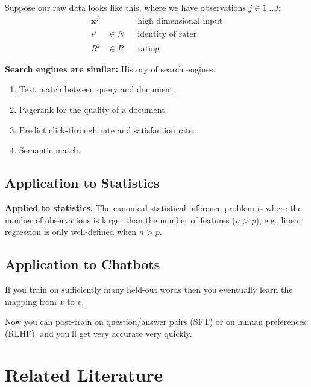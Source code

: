 \documentclass[
  10pt,
  letterpaper,
  DIV=11,
  numbers=noendperiod,
  oneside]{scrartcl}
\providecommand{\tightlist}{%
  \setlength{\itemsep}{0pt}\setlength{\parskip}{0pt}}\usepackage{longtable,booktabs,array}
\newcommand{\bm}[1]{\boldsymbol{#1}}
\begin{document}
Suppose our raw data looks like this, where we have observations
\(j\in 1\ldots J\): \[\begin{aligned}
      \bm{x}^j    &  && \text{high dimensional input}\\
      i^j  &\in N
         && \text{identity of rater}\\
      R^j  &\in R
         && \text{rating}
   \end{aligned}
   \]

\textbf{Search engines are similar:} History of search engines:

\begin{enumerate}
\def\labelenumi{\arabic{enumi}.}
\tightlist
\item
  Text match between query and document.
\item
  Pagerank for the quality of a document.
\item
  Predict click-through rate and satisfaction rate.
\item
  Semantic match.
\end{enumerate}

\subsection{Application to Statistics}\label{application-to-statistics}

\textbf{Applied to statistics.} The canonical statistical inference
problem is where the number of observations is larger than the number of
features (\(n>p\)), e.g.~linear regression is only well-defined when
\(n>p\).

\subsection{Application to Chatbots}\label{application-to-chatbots}

If you train on sufficiently many held-out words then you eventually
learn the mapping from \(x\) to \(v\).

Now you can post-train on question/answer pairs (SFT) or on human
preferences (RLHF), and you'll get very accurate very quickly.

\section{Related Literature}\label{related-literature}
\end{document}
